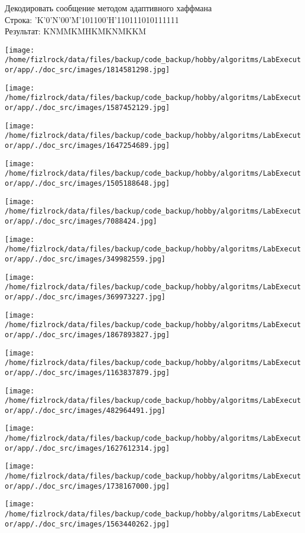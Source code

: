 \documentclass[a4paper, 12pt]{article}
\begin{document}
Декодировать сообщение методом адаптивного хаффмана \\
Строка: 
'K'0'N'00'M'101100'H'110111010111111\\
Результат: KNMMKMHKMKNMKKM

\texttt{[image: /home/fizlrock/data/files/backup/code\_backup/hobby/algoritms/LabExecutor/app/./doc\_src/images/1814581298.jpg]}

\texttt{[image: /home/fizlrock/data/files/backup/code\_backup/hobby/algoritms/LabExecutor/app/./doc\_src/images/1587452129.jpg]}

\texttt{[image: /home/fizlrock/data/files/backup/code\_backup/hobby/algoritms/LabExecutor/app/./doc\_src/images/1647254689.jpg]}

\texttt{[image: /home/fizlrock/data/files/backup/code\_backup/hobby/algoritms/LabExecutor/app/./doc\_src/images/1505188648.jpg]}

\texttt{[image: /home/fizlrock/data/files/backup/code\_backup/hobby/algoritms/LabExecutor/app/./doc\_src/images/7088424.jpg]}

\texttt{[image: /home/fizlrock/data/files/backup/code\_backup/hobby/algoritms/LabExecutor/app/./doc\_src/images/349982559.jpg]}

\texttt{[image: /home/fizlrock/data/files/backup/code\_backup/hobby/algoritms/LabExecutor/app/./doc\_src/images/369973227.jpg]}

\texttt{[image: /home/fizlrock/data/files/backup/code\_backup/hobby/algoritms/LabExecutor/app/./doc\_src/images/1867893827.jpg]}

\texttt{[image: /home/fizlrock/data/files/backup/code\_backup/hobby/algoritms/LabExecutor/app/./doc\_src/images/1163837879.jpg]}

\texttt{[image: /home/fizlrock/data/files/backup/code\_backup/hobby/algoritms/LabExecutor/app/./doc\_src/images/482964491.jpg]}

\texttt{[image: /home/fizlrock/data/files/backup/code\_backup/hobby/algoritms/LabExecutor/app/./doc\_src/images/1627612314.jpg]}

\texttt{[image: /home/fizlrock/data/files/backup/code\_backup/hobby/algoritms/LabExecutor/app/./doc\_src/images/1738167000.jpg]}

\texttt{[image: /home/fizlrock/data/files/backup/code\_backup/hobby/algoritms/LabExecutor/app/./doc\_src/images/1563440262.jpg]}
\end{document}
